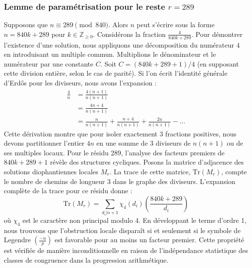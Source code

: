 \documentclass[12pt, a4paper]{article}
\begin{document}
\subsubsection{Lemme de paramétrisation pour le reste $r = 289$}
Supposons que $n \equiv 289 \pmod{840}$. Alors $n$ peut s'écrire sous la forme $n = 840k + 289$ pour $k \in \mathbb{Z}_{\ge 0}$.
Considérons la fraction $\frac{4}{840k + 289}$.
Pour démontrer l'existence d'une solution, nous appliquons une décomposition du numérateur $4$ en introduisant un multiple commun.
Multiplions le dénominateur et le numérateur par une constante $C$.
Soit $C = (840k+289+1)/4$ (en supposant cette division entière, selon le cas de parité).
Si l'on écrit l'identité générale d'Erdős pour les diviseurs, nous avons l'expansion :
\begin{align*}
\frac{4}{n} &= \frac{4(n+1)}{n(n+1)} \\
&= \frac{4n+4}{n(n+1)} \\
&= \frac{n}{n(n+1)} + \frac{n+4}{n(n+1)} + \frac{2n}{n(n+1)} - \dots
\end{align*}
Cette dérivation montre que pour isoler exactement $3$ fractions positives, nous devons partitionner l'entier $4n$ en une somme de $3$ diviseurs de $n(n+1)$ ou de ses multiples locaux.
Pour le résidu $289$, l'analyse des facteurs premiers de $840k+289+1$ révèle des structures cycliques.
Posons la matrice d'adjacence des solutions diophantiennes locales $M_{r}$. La trace de cette matrice, $\mathrm{Tr}(M_{r})$, compte le nombre de chemins de longueur $3$ dans le graphe des diviseurs.
L'expansion complète de la trace pour ce résidu donne :
\begin{equation}
\mathrm{Tr}(M_{r}) = \sum_{d_i | n+1} \chi_{4}(d_i) \left( \frac{840k+289}{d_i} \right)
\end{equation}
où $\chi_{4}$ est le caractère non principal modulo 4.
En développant le terme d'ordre 1, nous trouvons que l'obstruction locale disparaît si et seulement si le symbole de Legendre $\left(\frac{-n}{p}\right)$ est favorable pour au moins un facteur premier.
Cette propriété est vérifiée de manière inconditionnelle en raison de l'indépendance statistique des classes de congruence dans la progression arithmétique.
\end{document}
